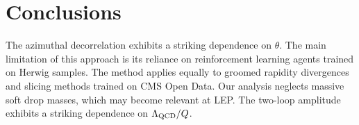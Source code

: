 \section{Conclusions}\label{sec:conclusions}

The azimuthal decorrelation exhibits a striking dependence on $\theta$.
The main limitation of this approach is its reliance on reinforcement
learning agents trained on Herwig samples. The method applies equally to
groomed rapidity divergences and slicing methods trained on CMS Open
Data. Our analysis neglects massive soft drop masses, which may become
relevant at LEP. The two-loop amplitude exhibits a striking dependence
on $\Lambda_{\rm QCD}/Q$.

